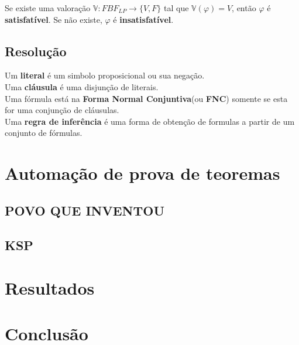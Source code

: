 \documentclass[a4paper,final,12pt]{article}
\begin{document}
	Se existe uma valoração $\mathbb{V} : FBF_{LP} \to \{V, F\}$ tal que $\mathbb{V}(\varphi) = V$, então $\varphi$ é \textbf{satisfatível}. Se não existe, $\varphi$ é \textbf{insatisfatível}.
	\subsection{Resolução}
	Um \textbf{literal} é um simbolo proposicional ou sua negação. \\
	\indent Uma \textbf{cláusula} é uma disjunção de literais. \\
	\indent Uma fórmula está na \textbf{Forma Normal Conjuntiva}(ou \textbf{FNC}) somente se esta for uma conjunção de cláusulas. \\
	\indent Uma \textbf{regra de inferência} é uma forma de obtenção de formulas a partir de um conjunto de fórmulas.
	
	\section{Automação de prova de teoremas}
	\subsection{POVO QUE INVENTOU}
	\subsection{KSP}
	
	\section{Resultados}
	\section{Conclusão}
	
\end{document}
